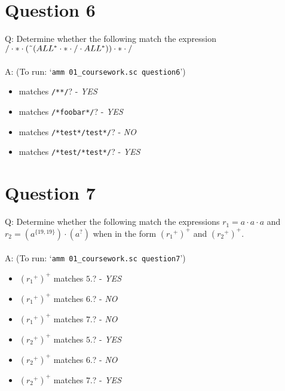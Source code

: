 \documentclass[english]{scrartcl}
\begin{document}
\section*{Question 6}
Q: Determine whether the following match the expression
$ / \cdot * \cdot (\char`\~(ALL^* \cdot * \cdot / \cdot ALL^*)) \cdot * \cdot /$
\\
\\
A: (To run: `\verb|amm 01_coursework.sc question6|') \\
\begin{itemize}
    \item matches \verb|/**/|? - \textit{YES}
    \item matches \verb|/*foobar*/|? - \textit{YES}
    \item matches \verb|/*test*/test*/|? - \textit{NO}
    \item matches \verb|/*test/*test*/|? - \textit{YES}

\end{itemize}

\section*{Question 7}
Q: Determine whether the following match the expressions $ r_1 = a \cdot a \cdot a$ and
$ r_2 = (a^{\{19,19\}}) \cdot (a^?)$ when in the form $({r_1}^+)^+$ and $({r_2}^+)^+$.
\\
\\
A: (To run: `\verb|amm 01_coursework.sc question7|')
\begin{itemize}
    \item $({r_1}^+)^+$ matches $5.$? - \textit{YES}
    \item $({r_1}^+)^+$ matches $6.$? - \textit{NO}
    \item $({r_1}^+)^+$ matches $7.$? - \textit{NO}
    \item $({r_2}^+)^+$ matches $5.$? - \textit{YES}
    \item $({r_2}^+)^+$ matches $6.$? - \textit{NO}
    \item $({r_2}^+)^+$ matches $7.$? - \textit{YES}
\end{itemize}
\end{document}
